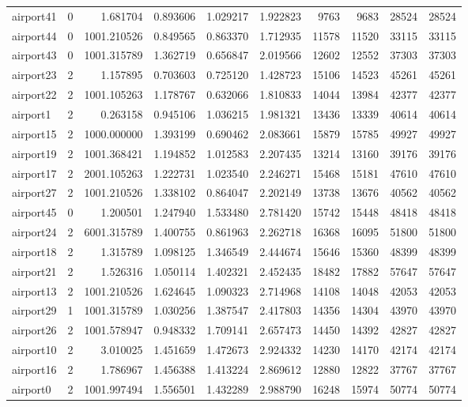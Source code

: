 \begin{longtable}{|l|r|r|r|r|r|r|r|r|r|}
airport41 & 0 & 1.681704 & 0.893606 & 1.029217 & 1.922823 & 9763 & 9683 & 28524 & 28524 \\
airport44 & 0 & 1001.210526 & 0.849565 & 0.863370 & 1.712935 & 11578 & 11520 & 33115 & 33115 \\
airport43 & 0 & 1001.315789 & 1.362719 & 0.656847 & 2.019566 & 12602 & 12552 & 37303 & 37303 \\
airport23 & 2 & 1.157895 & 0.703603 & 0.725120 & 1.428723 & 15106 & 14523 & 45261 & 45261 \\
airport22 & 2 & 1001.105263 & 1.178767 & 0.632066 & 1.810833 & 14044 & 13984 & 42377 & 42377 \\
airport1 & 2 & 0.263158 & 0.945106 & 1.036215 & 1.981321 & 13436 & 13339 & 40614 & 40614 \\
airport15 & 2 & 1000.000000 & 1.393199 & 0.690462 & 2.083661 & 15879 & 15785 & 49927 & 49927 \\
airport19 & 2 & 1001.368421 & 1.194852 & 1.012583 & 2.207435 & 13214 & 13160 & 39176 & 39176 \\
airport17 & 2 & 2001.105263 & 1.222731 & 1.023540 & 2.246271 & 15468 & 15181 & 47610 & 47610 \\
airport27 & 2 & 1001.210526 & 1.338102 & 0.864047 & 2.202149 & 13738 & 13676 & 40562 & 40562 \\
airport45 & 0 & 1.200501 & 1.247940 & 1.533480 & 2.781420 & 15742 & 15448 & 48418 & 48418 \\
airport24 & 2 & 6001.315789 & 1.400755 & 0.861963 & 2.262718 & 16368 & 16095 & 51800 & 51800 \\
airport18 & 2 & 1.315789 & 1.098125 & 1.346549 & 2.444674 & 15646 & 15360 & 48399 & 48399 \\
airport21 & 2 & 1.526316 & 1.050114 & 1.402321 & 2.452435 & 18482 & 17882 & 57647 & 57647 \\
airport13 & 2 & 1001.210526 & 1.624645 & 1.090323 & 2.714968 & 14108 & 14048 & 42053 & 42053 \\
airport29 & 1 & 1001.315789 & 1.030256 & 1.387547 & 2.417803 & 14356 & 14304 & 43970 & 43970 \\
airport26 & 2 & 1001.578947 & 0.948332 & 1.709141 & 2.657473 & 14450 & 14392 & 42827 & 42827 \\
airport10 & 2 & 3.010025 & 1.451659 & 1.472673 & 2.924332 & 14230 & 14170 & 42174 & 42174 \\
airport16 & 2 & 1.786967 & 1.456388 & 1.413224 & 2.869612 & 12880 & 12822 & 37767 & 37767 \\
airport0 & 2 & 1001.997494 & 1.556501 & 1.432289 & 2.988790 & 16248 & 15974 & 50774 & 50774 \\

\end{longtable}

